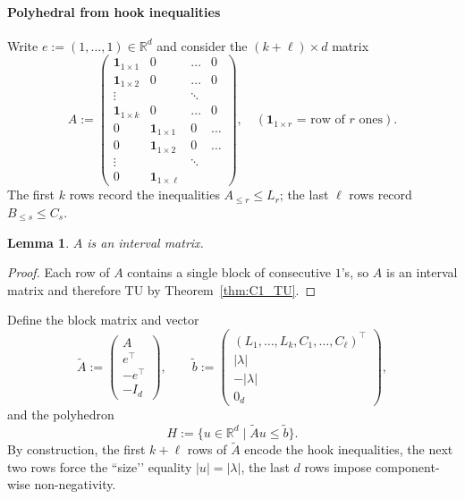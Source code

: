 \documentclass[12pt,a4paper,oneside]{amsart}
\newtheorem{lemma}{Lemma}[section]
\theoremstyle{definition}
\newcommand{\R}{\mathbb{R}}
\begin{document}
\paragraph{\textbf{Polyhedral from hook inequalities}}
Write $e:=(1,\dots ,1)\in\R^{d}$ and consider the
$(k+\ell)\times d$ matrix
\[
  A:=\begin{pmatrix}
        \mathbf 1_{1\times1} & 0 & \dots & 0\\
        \mathbf 1_{1\times2} & 0 & \dots & 0\\
        \vdots               &   & \ddots&   \\
        \mathbf 1_{1\times k}& 0 & \dots & 0\\
        0&\mathbf 1_{1\times1} & 0 & \dots \\
        0&\mathbf 1_{1\times2} & 0 & \dots \\
        \vdots&               &\ddots&   \\
        0&\mathbf 1_{1\times\ell}&      &
      \end{pmatrix},
  \quad(\text{$\mathbf 1_{1\times r}$ = row of $r$ ones}).
\]
The first $k$ rows record the inequalities
$A_{\le r}\le L_r$; the last $\ell$ rows record $B_{\le s}\le C_s$.

\begin{lemma}
    $A$ is an interval matrix.
\end{lemma}
\begin{proof}
    Each row of $A$ contains a single block of consecutive $1$’s, so $A$ is an interval matrix and therefore TU by Theorem~\ref{thm:C1_TU}.
\end{proof}

\smallskip
Define the block matrix and vector
\[
   \widetilde A
      :=\begin{pmatrix}
            A\\ e^{\!\top}\\ -e^{\!\top}\\ -I_d
         \end{pmatrix},
   \qquad
   \widetilde b
      :=\begin{pmatrix}
            (L_1,\dots ,L_k,C_1,\dots ,C_\ell)^{\!\top}\\[2pt]
            |\lambda|\\[2pt]
           -|\lambda|\\[2pt]
            0_d
         \end{pmatrix},
\]
and the polyhedron
\[
   H:=\{u\in\R^{d}\mid\widetilde Au\le\widetilde b\}.
\]
By construction, the first $k+\ell$ rows of $\widetilde A$ encode the hook inequalities, the next two rows force the “size’’ equality $|u|=|\lambda|$, the last $d$ rows impose component-wise non-negativity.
\end{document}
